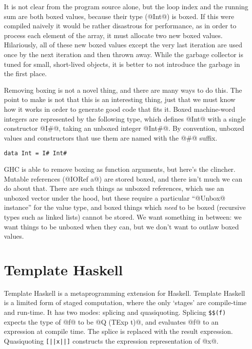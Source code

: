 It is not clear from the program source alone, but the loop index and the running sum are both boxed values, because their type (@Int@) is boxed.
If this were compiled naively it would be rather disastrous for performance, as in order to process each element of the array, it must allocate two new boxed values.
Hilariously, all of these new boxed values except the very last iteration are used once by the next iteration and then thrown away.
While the garbage collector is tuned for small, short-lived objects, it is better to not introduce the garbage in the first place.

Removing boxing is not a novel thing, and there are many ways to do this.
The point to make is not that this is an interesting thing, just that we must know how it works in order to generate good code that fits it.
Boxed machine-word integers are represented by the following type, which defines @Int@ with a single constructor @I#@, taking an unboxed integer @Int#@. By convention, unboxed values and constructors that use them are named with the @#@ suffix.

\begin{lstlisting}
data Int = I# Int#
\end{lstlisting}

GHC is able to remove boxing as function arguments, but here's the clincher.
Mutable references (@IORef a@) are stored boxed, and there isn't much we can do about that.
There are such things as unboxed references, which use an unboxed vector under the hood, but these require a particular ``@Unbox@ instance'' for the value type, and boxed things which \emph{need} to be boxed (recursive types such as linked lists) cannot be stored.
We want something in between: we want things to be unboxed when they can, but we don't want to outlaw boxed values.




\section{Template Haskell}
Template Haskell is a metaprogramming extension for Haskell.
Template Haskell is a limited form of staged computation, where the only `stages' are compile-time and run-time.
It has two modes: splicing and quasiquoting.
Splicing \verb/$$(f)/ expects the type of @f@ to be @Q (TExp t)@, and evaluates @f@ to an expression at compile time.
The splice is replaced with the result expression.
Quasiquoting \lstinline/[||x||]/ constructs the expression representation of @x@.

